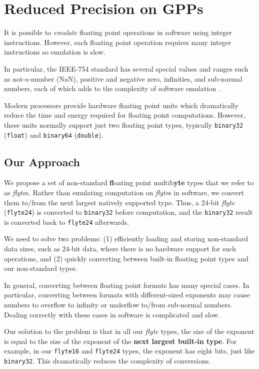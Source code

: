 \documentclass{sig-alternate-05-2015}
\newcommand{\mt}[1]{\texttt{#1}}
\begin{document}
\section{Reduced Precision on GPPs}
\label{sec:scheme}

It is possible to \textit{emulate} floating point operations in software using
integer instructions. However, each floating point operation requires many
integer instructions so emulation is slow.

In particular, the IEEE-754 standard has several special values and ranges such
as not-a-number (NaN), positive and negative zero, infinities, and sub-normal
numbers, each of which adds to the complexity of software emulation
\cite{sidwell2006improving}.

Modern processors provide hardware floating point units which dramatically
reduce the time and energy required for floating point computations. However,
these units normally support just two floating point types, typically
\mt{binary32} (\mt{float}) and \mt{binary64} (\mt{double}).





\subsection{Our Approach}
\label{sec:approach}

We propose a set of non-standard \textbf{fl}oating point multib\textbf{yte}
types that we refer to as \textit{flyte}s. Rather than emulating computation on
\textit{flyte}s in software, we convert them to/from the next largest natively
supported type. Thus, a 24-bit \textit{flyte} (\mt{flyte24}) is converted to
\mt{binary32} before computation, and the \mt{binary32} result is converted
back to \mt{flyte24} afterwards.

We need to solve two problems: (1) efficiently
loading and storing non-standard data sizes, such as 24-bit data, where there
is no hardware support for such operations, and (2) quickly converting between
built-in floating point types and our non-standard types.

In general, converting between floating point formats has many special cases.
In particular, converting between formats with different-sized exponents may
cause numbers to overflow to infinity or underflow to/from sub-normal numbers.
Dealing correctly with these cases in software is complicated and slow.

Our solution to the problem is that in all our \textit{flyte} types, the size
of the exponent is equal to the size of the exponent of the \textbf{next
largest built-in type}. For example, in our \mt{flyte16} and \mt{flyte24}
types, the exponent has eight bits, just like \mt{binary32}. This dramatically
reduces the complexity of conversions.
\end{document}
